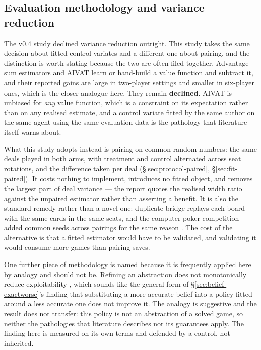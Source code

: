 \subsection{Evaluation methodology and variance reduction}
\label{app:rel-eval}

The v0.4 study declined variance reduction outright. This study takes the same
decision about fitted control variates and a different one about pairing, and
the distinction is worth stating because the two are often filed together.
Advantage-sum estimators \cite{zinkevich-divat} and AIVAT \cite{burch-aivat}
learn or hand-build a value function and subtract it, and their reported gains
are large in two-player settings and smaller in six-player ones, which is the
closer analogue here. They remain \textbf{declined}. AIVAT is unbiased for
\emph{any} value function, which is a constraint on its expectation rather than
on any realised estimate, and a control variate fitted by the same author on the
same agent using the same evaluation data is the pathology that literature
itself warns about.

What this study adopts instead is pairing on common random numbers: the same
deals played in both arms, with treatment and control alternated across seat
rotations, and the difference taken per deal
(\S\ref{sec:protocol-paired}, \S\ref{sec:fit-paired}). It costs nothing to
implement, introduces no fitted object, and removes the largest part of deal
variance --- the report quotes the realised width ratio against the unpaired
estimator rather than asserting a benefit. It is also the standard remedy rather
than a novel one: duplicate bridge replays each board with the same cards in the
same seats, and the computer poker competition added common seeds across
pairings for the same reason \cite{acpc}. The cost of the alternative is that a
fitted estimator would have to be validated, and validating it would consume
more games than pairing saves.

One further piece of methodology is named because it is frequently applied here
by analogy and should not be. Refining an abstraction does not monotonically
reduce exploitability \cite{waugh-abstraction}, which sounds like the general
form of \S\ref{sec:belief-exactworse}'s finding that substituting a more
accurate belief into a policy fitted around a less accurate one does not improve
it. The analogy is suggestive and the result does not transfer: this policy is
not an abstraction of a solved game, so neither the pathologies that literature
describes nor its guarantees apply. The finding here is measured on its own
terms and defended by a control, not inherited.

